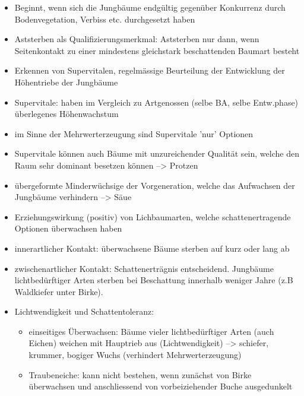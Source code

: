 \documentclass{article}
\begin{document}
\begin{itemize}
	
 \item Beginnt, wenn sich die Jungbäume endgültig gegenüber Konkurrenz durch Bodenvegetation, Verbiss etc. durchgesetzt haben
 
 \item Aststerben als Qualifizierungsmerkmal: Aststerben nur dann, wenn Seitenkontakt zu einer mindestens gleichstark beschattenden Baumart besteht
 
 \item Erkennen von Supervitalen, regelmässige Beurteilung der Entwicklung der Höhentriebe der Jungbäume
 
 \item Supervitale: haben im Vergleich zu Artgenossen (selbe BA, selbe Entw.phase) überlegenes Höhenwachstum 
 
 \item im Sinne der Mehrwerterzeugung sind Supervitale 'nur' Optionen
 
 \item Supervitale können auch Bäume mit unzureichender Qualität sein, welche den Raum sehr dominant besetzen können --> Protzen
 
 \item übergeformte Minderwüchsige der Vorgeneration, welche das Aufwachsen der Jungbäume verhindern --> Säue
 
 \item Erziehungswirkung (positiv) von Lichbaumarten, welche schattenertragende Optionen überwachsen haben
 
 \item innerartlicher Kontakt: überwachsene Bäume sterben auf kurz oder lang ab 
 
 \item zwischenartlicher Kontakt: Schattenerträgnis entscheidend. Jungbäume lichtbedürftiger Arten sterben bei Beschattung innerhalb weniger Jahre (z.B Waldkiefer unter Birke).
 
 \item Lichtwendigkeit und Schattentoleranz: 
	 \begin{itemize}
	 \item einseitiges Überwachsen: Bäume vieler lichtbedürftiger Arten (auch Eichen) weichen mit Hauptrieb aus (Lichtwendigkeit) --> schiefer, krummer, bogiger Wuchs (verhindert Mehrwerterzeugung)
	 
	 \item Traubeneiche: kann nicht bestehen, wenn zunächst von Birke überwachsen und anschliessend von vorbeiziehender Buche ausgedunkelt
	 

\end{itemize}
\end{itemize}
\end{document}
